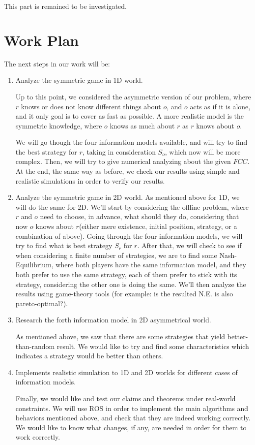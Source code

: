 \documentclass[a4paper,english,10pt]{article}
\newcommand\rob{\ensuremath{r}\xspace}
\newcommand\opp{\ensuremath{o}\xspace}
\newcommand{\fcc}{\ensuremath{FCC}\xspace}
\begin{document}
This part is remained to be investigated. 

\section{Work Plan}
The next steps in our work will be:
\begin{enumerate}
\item Analyze the symmetric game in 1D world.

Up to this point, we considered the asymmetric version of our problem, where \rob knows or does not know different things about \opp, and \opp acts as if it is alone, and it only goal is to cover as fast as possible.
A more realistic model is the symmetric knowledge, where \opp knows as much about \rob as \rob knows about \opp.

We will go though the four information models available, and will try to find the best strategy for \rob, taking in consideration $S_\opp$, which now will be more complex. Then, we will try to give numerical analyzing about the given \fcc. At the end, the same way as before, we check our results using simple and realistic simulations in order to verify our results.

\item Analyze the symmetric game in 2D world.
As mentioned above for 1D, we will do the same for 2D.
We'll start by considering the offline problem, where \rob and \opp need to choose, in advance, what should they do, considering that now \opp knows about \rob (either mere existence, initial position, strategy, or a combination of above).
Going through the four information models, we will try to find what is  best strategy $S_\rob$ for \rob. 
After that, we will check to see if when considering a finite number of strategies, we are to find some Nash-Equilibrium, where both players have the same information model, and they both prefer to use the same strategy, each of them prefer to stick with its strategy, considering the other one is doing the same. We'll then analyze the results using game-theory tools (for example: is the resulted N.E. is also pareto-optimal?).

\item Research the forth information model in 2D asymmetrical world.

As mentioned above, we saw that there are some strategies that yield better-than-random result. 
We would like to try and find some characteristics which indicates a strategy would be better than others.

\item Implements realistic simulation to 1D and 2D worlds for different cases of information models.

Finally, we would like and test our claims and theorems under real-world constraints. We will use ROS in order to implement the main algorithms and behaviors mentioned above, and check that they are indeed working correctly.
We would like to know what changes, if any, are needed in order for them to work correctly.

\end{enumerate}




\end{document}
